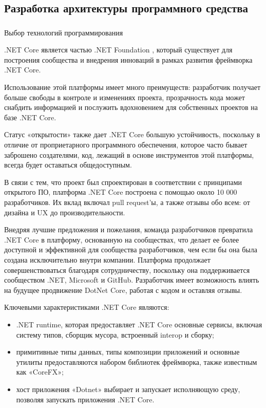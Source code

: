 \subsection{Разработка архитектуры программного средства}
\label{sec:design:architecture}

\subsubsection{} Выбор технологий программирования
\label{sec:design:architecture:language}

.NET Core является частью .NET Foundation \cite{fridman}, который существует для построения сообщества и внедрения инноваций в рамках развития фреймворка .NET Core.

Использование этой платформы имеет много преимуществ: разработчик получает больше свободы в контроле и изменениях проекта, прозрачность кода может снабдить информацией и послужить вдохновением для собственных проектов на базе .NET Core.

Статус «открытости» также дает .NET Core большую устойчивость, поскольку в отличие от проприетарного программного обеспечения, которое часто бывает заброшено создателями, код, лежащий в основе инструментов этой платформы, всегда будет оставаться общедоступным.

В связи с тем, что проект был спроектирован в соответствии с принципами открытого ПО, платформа .NET Core построена с помощью около 10 000 разработчиков. Их вклад включал pull request’ы, а также отзывы обо всем: от дизайна и UX до производительности.

Внедряя лучшие предложения и пожелания, команда разработчиков превратила .NET Core в платформу, основанную на сообществах, что делает ее более доступной и эффективной для сообщества разработчиков, чем если бы она была создана исключительно внутри компании. Платформа продолжает совершенствоваться благодаря сотрудничеству, поскольку она поддерживается сообществом .NET, Microsoft и GitHub. Разработчик имеет возможность влиять на будущее продвижение DotNet Core, работая с кодом и оставляя отзывы.

Ключевыми характеристиками .NET Core являются:

\begin{itemize}
	\item .NET runtime, которая предоставляет .NET Core основные сервисы, включая систему типов, сборщик мусора, встроенный interop и сборку;
	\item примитивные типы данных, типы композиции приложений и основные утилиты предоставляются набором библиотек фреймворка, также известным как «CoreFX»;
	\item хост приложения «Dotnet» выбирает и запускает исполняющую среду, позволяя запускать приложения .NET Core.
\end{itemize}


